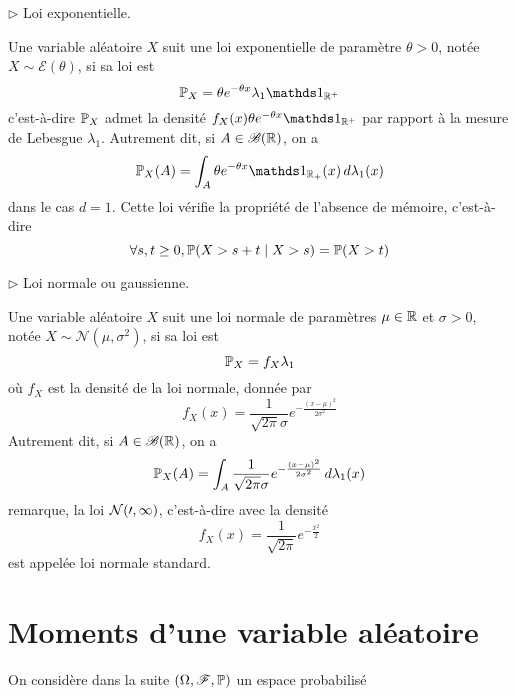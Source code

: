 \(\triangleright\) Loi exponentielle.

Une variable aléatoire \(X\) suit une loi exponentielle de paramètre \(\theta>0\), notée \(X\sim\mathcal E(\theta)\), si sa loi est
\begin{equation*}
    \bb P_X = \theta e^{-\theta x}\lambda_1\one_{\R^+}
\end{equation*}
c'est-à-dire \(\mathbb{P}_X\) admet la densité \(f_X(x)\theta e^{-\theta x}\one_{\R^+}\) par rapport à la mesure de Lebesgue \(\lambda_1\). Autrement dit,
si \(A\in\mathscr{B}(\mathbb{R})\), on a
\begin{equation*}
    \bb P_X(A) = \int_A \theta e^{-\theta x}\one_{\R_+}(x)\der\lambda_1(x)
\end{equation*}
dans le cas \(d=1\). Cette loi vérifie la propriété de l'absence de mémoire, c'est-à-dire
\begin{equation*}
    \forall s,t\geq 0, \mathbb{P}(X>s+t\mid X>s) = \mathbb{P}(X>t)
\end{equation*}


\(\triangleright\) Loi normale ou gaussienne.

Une variable aléatoire \(X\) suit une loi normale de paramètres \(\mu\in\mathbb{R}\) et \(\sigma>0\), notée \(X\sim\mathcal N(\mu,\sigma^2)\), si sa loi est
\begin{equation*}
    \mathbb{P}_X = f_X\lambda_1
\end{equation*}
où \(f_X\) est la densité de la loi normale, donnée par
\begin{equation*}
    f_X(x) = \frac{1}{\sqrt{2\pi}\sigma}e^{-\frac{{(x-\mu)}^2}{2\sigma^2}}
\end{equation*}
Autrement dit, si \(A\in\mathscr{B}(\mathbb{R})\), on a
\begin{equation*}
    \mathbb{P}_X(A) = \int_A \frac{1}{\sqrt{2\pi}\sigma}e^{-\frac{{(x-\mu)}^2}{2\sigma^2}}\mathop{}\!{d}\lambda_1(x)
\end{equation*}
remarque, la loi \(\cal N(0,1)\), c'est-à-dire avec la densité
\begin{equation*}
    f_X(x) = \frac{1}{\sqrt{2\pi}}e^{-\frac{x^2}{2}}
\end{equation*}
est appelée loi normale standard.


\section{Moments d'une variable aléatoire} %

On considère dans la suite \(\left(\Omega, \mathscr{F}, \mathbb{P}\right)\) un
espace probabilisé

